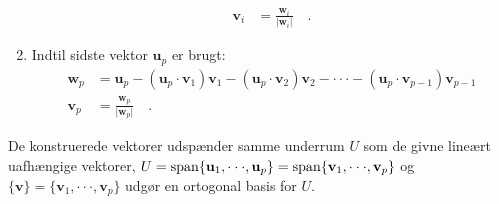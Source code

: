 \begin{method}
\begin{enumerate}
\begin{equation}
\begin{aligned}
\mathbf{v}_{i} &= \frac{\mathbf{w}_{i}}{\vert \mathbf{w}_{i} \vert} \quad .
\end{aligned}
\end{equation}
\item Indtil sidste vektor $\mathbf{u}_{p}$ er brugt:
\begin{equation}
\begin{aligned}
\mathbf{w}_{p} &= \mathbf{u}_{p} -  \left(\mathbf{u}_{p} \cdot \mathbf{v}_{1}\right)\mathbf{v}_{1} - \left(\mathbf{u}_{p} \cdot \mathbf{v}_{2}\right)\mathbf{v}_{2} - \cdot \cdot \cdot -\left(\mathbf{u}_{p} \cdot \mathbf{v}_{p-1}\right)\mathbf{v}_{p-1}\\
\mathbf{v}_{p} &= \frac{\mathbf{w}_{p}}{\vert \mathbf{w}_{p} \vert} \quad .
\end{aligned}
\end{equation}
\end{enumerate}
De konstruerede vektorer udspænder samme underrum $U$ som de givne lineært uafhængige vektorer,  $U = \mathrm{span}\{\mathbf{u}_{1}, \cdot  \cdot \cdot, \mathbf{u}_{p} \} = \mathrm{span}\{\mathbf{v}_{1}, \cdot  \cdot \cdot, \mathbf{v}_{p} \} $ og $\{ \mathbf{v} \} = \{ \mathbf{v}_{1}, \cdot  \cdot \cdot, \mathbf{v}_{p}  \}$ udgør en ortogonal basis for $U$.
\end{method}



